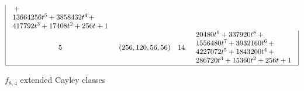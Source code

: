 \documentclass[12pt,a4paper]{article}
\begin{document}
\begin{table}[!bhpt]
\begin{align*}
\begin{array}{|cccl|}
\begin{array}{l}
\,+
\\
 13664256t^{5} + 3858432t^{4}
\,+
\\
 417792t^{3} + 17408t^{2} + 256t + 1
\end{array}
\\
5 &
(256, 120, 56, 56) &
14 &
\begin{array}{l}
20480t^{9} + 337920t^{8}
\,+
\\
 1556480t^{7} + 3932160t^{6}
\,+
\\
 4227072t^{5} + 1843200t^{4}
\,+
\\
 286720t^{3} + 15360t^{2} + 256t + 1
\end{array}
\\
\hline
\end{array}
\end{align*}
\caption{$f_{8,4}$ extended Cayley classes}
\label{tab-c8_4_EC_classes}
\end{table}
\end{document}
